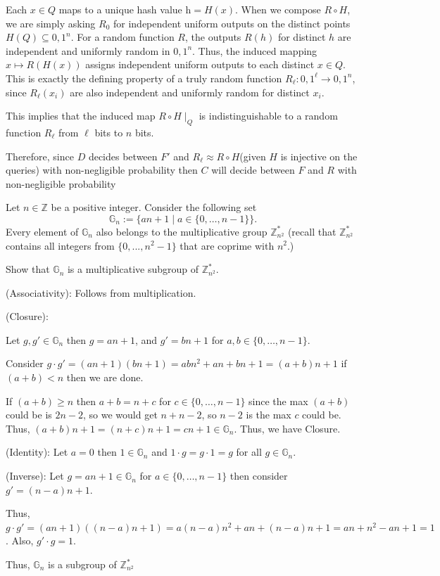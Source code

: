 \documentclass[12pt, letterpaper]{article}
\newcommand{\Z}{\mathbb{Z}}
\begin{document}
\begin{problemproof}
    Each $x \in Q$ maps to a unique hash value h$ = H(x)$.
    When we compose $R \circ H$, we are simply asking $R_0$ for independent uniform outputs on the distinct points $H(Q)\subseteq{0,1}^n$.
    For a random function $R$, the outputs $R(h)$ for distinct $h$ are independent and uniformly random in ${0,1}^n$.
    Thus, the induced mapping $x \mapsto R(H(x))$ assigns independent uniform outputs to each distinct $x\in Q$.
    This is exactly the defining property of a truly random function $R_\ell : {0,1}^\ell \to {0,1}^n$, since $R_\ell(x_i)$ are also independent and  uniformly random for distinct $x_i$.
    
    This implies that the induced map $R \circ H \mid_{Q}$ is indistinguishable to a random function $R_\ell$ from $\ell$ bits to $n$ bits.

    Therefore, since $D$ decides between $F'$ and $R_\ell \approx R \circ H$(given $H$ is injective on the queries) with non-negligible probability then $C$ will decide between $F$ and $R$ with non-negligible probability
\end{problemproof}
\begin{problem}{}
    Let $n\in\Z$ be a positive integer. Consider the
    following set \[\mathbb{G}_n := \{ an + 1 \mid a \in \{0, \ldots, n-1\} \}.\]
    Every element of $\mathbb{G}_n$ also belongs to the multiplicative group $\Z_{n^2}^*$ (recall that  $\Z_{n^2}^*$ contains all integers from $\{0,...,n^2-1\}$ that are coprime with $n^2$.)

    Show that $\mathbb{G}_n$ is a multiplicative subgroup of $\Z_{n^2}^*$.
\end{problem}
\begin{problemproof}
    (Associativity): Follows from multiplication.
    
    (Closure):

    Let $g,g' \in \mathbb{G}_n$ then $g=an+1$, and $g'=bn+1$ for $a,b \in \{0,\dots,n-1\}$.

    Consider $g \cdot g' = (an+1)(bn+1)=abn^2+an+bn+1=(a+b)n+1$ if $(a+b) < n$ then we are done. 

    If $(a+b) \geq n$ then $a+b=n+c$ for $c \in \{0,\dots,n-1\}$ since the max $(a+b)$ could be is $2n-2$, so we would get $n+n-2$, so $n-2$ is the max $c$ could be. Thus, $(a+b)n+1=(n+c)n+1 = cn+1 \in \mathbb{G}_n$. Thus, we have Closure.

    (Identity): Let $a = 0$ then $1 \in \mathbb{G}_n$ and $1 \cdot g = g \cdot 1 = g$ for all $g \in \mathbb{G}_n$.

    (Inverse): Let $g=an+1 \in \mathbb{G}_n$ for $a \in \{0,\dots,n-1\}$ then consider $g'=(n-a)n+1$.

    Thus, $g \cdot g' = (an+1)((n-a)n+1)=a(n-a)n^2+an+(n-a)n+1=an+n^2-an+1=1$. Also, $g' \cdot g = 1$.

    Thus, $\mathbb{G}_n$ is a subgroup of $\Z_{n^2}^*$
\end{problemproof}
\end{document}
